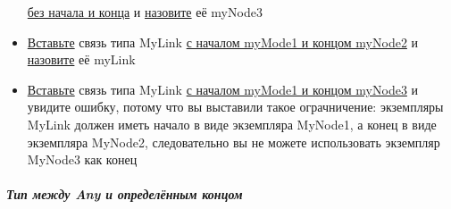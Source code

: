 \documentclass{article}
\begin{document}
\begin{itemize}
        \hyperlink{FAQ.HowToInsertLinkWithoutFromAndTo}{без начала и конца} и
        \hyperlink{FAQ.HowToSetName}{назовите} её myNode3
  \item \hyperlink{DeepCase.InsertLink.Description}{Вставьте} связь типа MyLink
        \hyperlink{FAQ.HowToInsertLinkWithFromAndTo}{с началом myMode1 и концом
          myNode2} и \hyperlink{FAQ.HowToSetName}{назовите} её myLink
  \item \hyperlink{DeepCase.InsertLink.Description}{Вставьте} связь типа MyLink
        \hyperlink{FAQ.HowToInsertLinkWithFromAndTo}{с началом myMode1 и концом
          myNode3} и увидите ошибку, потому что вы выставили такое ограчничение:
        экземпляры MyLink должен иметь начало в виде экземпляра  MyNode1, а конец в
        виде экземпляра MyNode2, следовательно вы не можете использовать экземпляр
        MyNode3 как конец
\end{itemize}
\subparagraph{Тип между Any и определённым концом}
\end{document}
